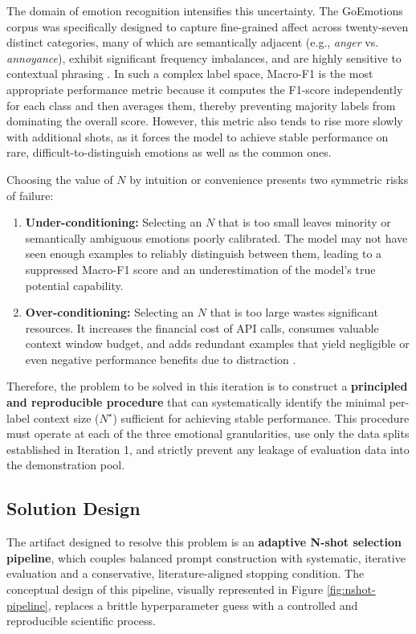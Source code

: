 The domain of emotion recognition intensifies this uncertainty. The GoEmotions corpus was specifically designed to capture fine-grained affect across twenty-seven distinct categories, many of which are semantically adjacent (e.g., \textit{anger} vs. \textit{annoyance}), exhibit significant frequency imbalances, and are highly sensitive to contextual phrasing \cite{demszky2020goemotions}. In such a complex label space, Macro-F1 is the most appropriate performance metric because it computes the F1-score independently for each class and then averages them, thereby preventing majority labels from dominating the overall score. However, this metric also tends to rise more slowly with additional shots, as it forces the model to achieve stable performance on rare, difficult-to-distinguish emotions as well as the common ones.

Choosing the value of $N$ by intuition or convenience presents two symmetric risks of failure:
\begin{enumerate}
    \item \textbf{Under-conditioning:} Selecting an $N$ that is too small leaves minority or semantically ambiguous emotions poorly calibrated. The model may not have seen enough examples to reliably distinguish between them, leading to a suppressed Macro-F1 score and an underestimation of the model's true potential capability.
    \item \textbf{Over-conditioning:} Selecting an $N$ that is too large wastes significant resources. It increases the financial cost of API calls, consumes valuable context window budget, and adds redundant examples that yield negligible or even negative performance benefits due to distraction \cite{kaplan2020scaling}.
\end{enumerate}

Therefore, the problem to be solved in this iteration is to construct a \textbf{principled and reproducible procedure} that can systematically identify the minimal per-label context size ($N^{\star}$) sufficient for achieving stable performance. This procedure must operate at each of the three emotional granularities, use only the data splits established in Iteration 1, and strictly prevent any leakage of evaluation data into the demonstration pool.

\subsection{Solution Design}

The artifact designed to resolve this problem is an \textbf{adaptive N-shot selection pipeline}, which couples balanced prompt construction with systematic, iterative evaluation and a conservative, literature-aligned stopping condition. The conceptual design of this pipeline, visually represented in Figure \ref{fig:nshot-pipeline}, replaces a brittle hyperparameter guess with a controlled and reproducible scientific process.

